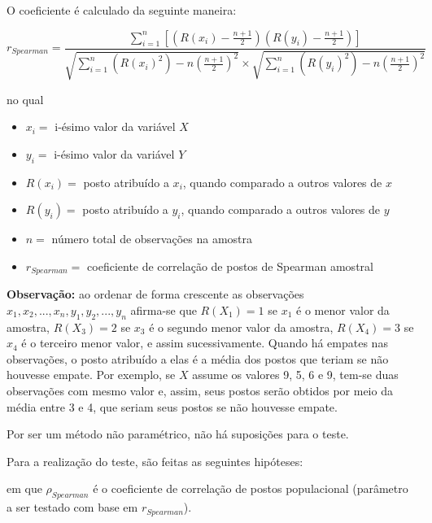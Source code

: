 \documentclass[
]{estat/estat}
\providecommand{\tightlist}{%
  \setlength{\itemsep}{0pt}\setlength{\parskip}{0pt}}\usepackage{longtable,booktabs,array}
\begin{document}
O coeficiente é calculado da seguinte maneira:

\[
r_{Spearman} = \frac{ \displaystyle \sum_{i=1}^{n}  \left[\left(R(x_i)-\frac{n+1}{2}\right)\left(R(y_i)-\frac{n+1}{2}\right)\right]}
{\sqrt{\displaystyle \sum_{i=1}^{n}  \left(R(x_i)^2\right)-n\left(\frac{n+1}{2}\right)^{2}}  \times \sqrt{\displaystyle \sum_{i=1}^{n}  \left(R(y_i)^2 \right) -n\left(\frac{n+1}{2}\right)^{2}}}
\]

no qual

\begin{itemize}
\tightlist
\item
  \(x_i=\) i-ésimo valor da variável \(X\)
\item
  \(y_i=\) i-ésimo valor da variável \(Y\)
\item
  \(R(x_i)=\) posto atribuído a \(x_{i}\), quando comparado a outros
  valores de \(x\)
\item
  \(R(y_i)=\) posto atribuído a \(y_{i}\), quando comparado a outros
  valores de \(y\)
\item
  \(n=\) número total de observações na amostra
\item
  \(r_{Spearman}=\) coeficiente de correlação de postos de Spearman
  amostral
\end{itemize}

\textbf{Observação:} ao ordenar de forma crescente as observações
\(x_1,x_2,...,x_n,y_1,y_2,...,y_n\) afirma-se que \(R(X_1)=1\) se
\(x_1\) é o menor valor da amostra, \(R(X_3)=2\) se \(x_3\) é o segundo
menor valor da amostra, \(R(X_4)=3\) se \(x_4\) é o terceiro menor
valor, e assim sucessivamente. Quando há empates nas observações, o
posto atribuído a elas é a média dos postos que teriam se não houvesse
empate. Por exemplo, se \(X\) assume os valores 9, 5, 6 e 9, tem-se duas
observações com mesmo valor e, assim, seus postos serão obtidos por meio
da média entre 3 e 4, que seriam seus postos se não houvesse empate.

Por ser um método não paramétrico, não há suposições para o teste.

Para a realização do teste, são feitas as seguintes hipóteses:


em que \(\rho_{Spearman}\) é o coeficiente de correlação de postos
populacional (parâmetro a ser testado com base em \(r_{Spearman}\)).
\end{document}
